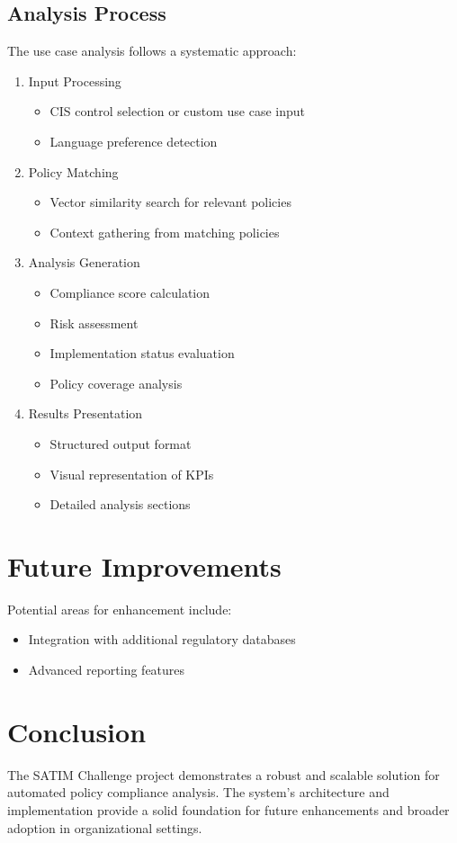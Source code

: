 \documentclass[11pt,a4paper]{article}
\begin{document}
\subsection{Analysis Process}
The use case analysis follows a systematic approach:
\begin{enumerate}
    \item Input Processing
    \begin{itemize}
        \item CIS control selection or custom use case input
        \item Language preference detection
    \end{itemize}
    \item Policy Matching
    \begin{itemize}
        \item Vector similarity search for relevant policies
        \item Context gathering from matching policies
    \end{itemize}
    \item Analysis Generation
    \begin{itemize}
        \item Compliance score calculation
        \item Risk assessment
        \item Implementation status evaluation
        \item Policy coverage analysis
    \end{itemize}
    \item Results Presentation
    \begin{itemize}
        \item Structured output format
        \item Visual representation of KPIs
        \item Detailed analysis sections
    \end{itemize}
\end{enumerate}

\section{Future Improvements}
Potential areas for enhancement include:
\begin{itemize}
    \item Integration with additional regulatory databases
    \item Advanced reporting features
\end{itemize}


\section{Conclusion}
The SATIM Challenge project demonstrates a robust and scalable solution for automated policy compliance analysis. The system's architecture and implementation provide a solid foundation for future enhancements and broader adoption in organizational settings.

\appendix
\end{document}
